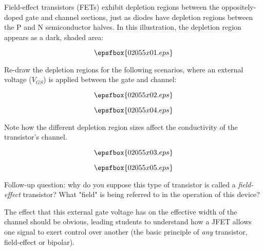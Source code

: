 

Field-effect transistors (FETs) exhibit depletion regions between the oppositely-doped gate and channel sections, just as diodes have depletion regions between the P and N semiconductor halves.  In this illustration, the depletion region appears as a dark, shaded area:

$$\epsfbox{02055x01.eps}$$

Re-draw the depletion regions for the following scenarios, where an external voltage ($V_{GS}$) is applied between the gate and channel:

$$\epsfbox{02055x02.eps}$$

$$\epsfbox{02055x04.eps}$$

Note how the different depletion region sizes affect the conductivity of the transistor's channel.







$$\epsfbox{02055x03.eps}$$

$$\epsfbox{02055x05.eps}$$

\vskip 10pt

Follow-up question: why do you suppose this type of transistor is called a {\it field-effect} transistor?  What "field" is being referred to in the operation of this device?







The effect that this external gate voltage has on the effective width of the channel should be obvious, leading students to understand how a JFET allows one signal to exert control over another (the basic principle of {\it any} transistor, field-effect or bipolar).




